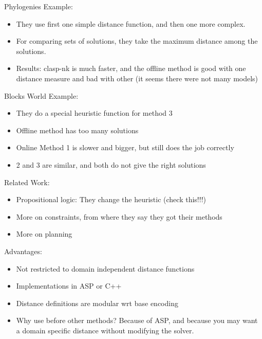 \flushleft
Phylogenies Example:
\begin{itemize}
\item
    They use first one simple distance function, and then one more complex.
\item
    For comparing sets of solutions, they take the maximum distance among the solutions.
\item
    Results: clasp-nk is much faster, and
    the offline method is good with one distance measure and bad with other
    (it seems there were not many models)
\end{itemize}

\flushleft
Blocks World Example:
\begin{itemize}
\item
    They do a special heuristic function for method 3
\item
    Offline method has too many solutions
\item
    Online Method 1 is slower and bigger, but still does the job correctly
\item
    2 and 3 are similar, and both do not give the right solutions
\end{itemize}

\flushleft
Related Work:
\begin{itemize}
\item
    Propositional logic: They change the heuristic (check this!!!)
\item
    More on constraints, from where they say they got their methods
\item
    More on planning
\end{itemize}

\flushleft
Advantages:
\begin{itemize}
\item
    Not restricted to domain independent distance functions
\item
    Implementations in ASP or C++
\item
    Distance definitions are modular wrt base encoding
\item
    Why use before other methods? Because of ASP, and because you may want a domain specific distance
    without modifying the solver.
\end{itemize}




